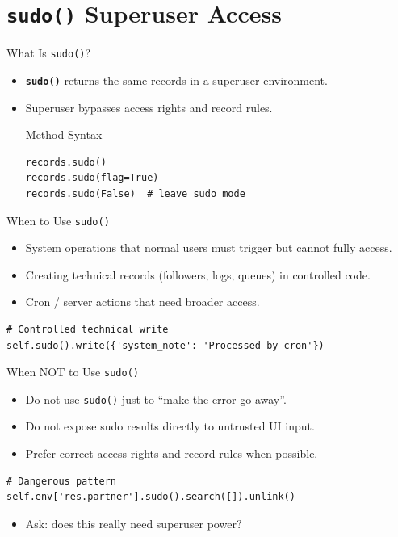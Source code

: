 \section{\textbf{\texttt{sudo()}} Superuser Access}

\begin{frame}[fragile]{What Is \texttt{sudo()}?}
	\begin{itemize}
		\item \textbf{\texttt{sudo()}} returns the same records in a superuser environment.
		\item Superuser bypasses access rights and record rules.
\begin{block}{Method Syntax}
\begin{lstlisting}
records.sudo()
records.sudo(flag=True)
records.sudo(False)  # leave sudo mode
\end{lstlisting}
\end{block}
	\end{itemize}
\end{frame}

\begin{frame}[fragile]{When to Use \texttt{sudo()}}
	\begin{itemize}
		\item System operations that normal users must trigger but cannot fully access.
		\item Creating technical records (followers, logs, queues) in controlled code.
		\item Cron / server actions that need broader access.
	\end{itemize}
\begin{lstlisting}
# Controlled technical write
self.sudo().write({'system_note': 'Processed by cron'})
\end{lstlisting}
\end{frame}

\begin{frame}[fragile]{When NOT to Use \texttt{sudo()}}
	\begin{itemize}
		\item Do not use \texttt{sudo()} just to ``make the error go away''.
		\item Do not expose sudo results directly to untrusted UI input.
		\item Prefer correct access rights and record rules when possible.
	\end{itemize}
\begin{lstlisting}
# Dangerous pattern
self.env['res.partner'].sudo().search([]).unlink()
\end{lstlisting}
	\begin{itemize}
		\item Ask: does this really need superuser power?
	\end{itemize}
\end{frame}

